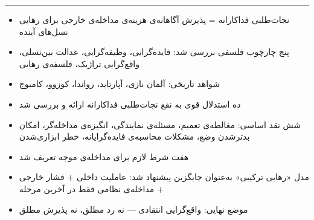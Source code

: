 \vspace{1em}
\begin{center}
\rule{0.5\linewidth}{0.4pt}
\end{center}
\vspace{1em}

\begin{tcolorbox}[mybox, title={خلاصه‌ی فصل ۱۵ در یک نگاه}]
\begin{itemize}
\item نجات‌طلبی فداکارانه = پذیرش آگاهانه‌ی هزینه‌ی مداخله‌ی خارجی برای رهایی نسل‌های آینده
\item پنج چارچوب فلسفی بررسی شد: فایده‌گرایی، وظیفه‌گرایی، عدالت بین‌نسلی، واقع‌گرایی تراژیک، فلسفه‌ی رهایی
\item شواهد تاریخی: آلمان نازی، آپارتاید، رواندا، کوزوو، کامبوج
\item ده استدلال قوی به نفع نجات‌طلبی فداکارانه ارائه و بررسی شد
\item شش نقد اساسی: مغالطه‌ی تعمیم، مسئله‌ی نمایندگی، انگیزه‌ی مداخله‌گر، امکان بدترشدن وضع، مشکلات محاسبه‌ی فایده‌گرایانه، خطر ابزاری‌شدن
\item هفت شرط لازم برای مداخله‌ی موجه تعریف شد
\item مدل «رهایی ترکیبی» به‌عنوان جایگزین پیشنهاد شد: عاملیت داخلی + فشار خارجی + مداخله‌ی نظامی فقط در آخرین مرحله
\item موضع نهایی: واقع‌گرایی انتقادی — نه رد مطلق، نه پذیرش مطلق
\end{itemize}
\end{tcolorbox}